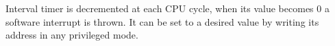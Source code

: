 \label{sec:man:devices}

\label{sec:man:intervalTimer}

Interval timer is decremented at each CPU cycle, when its value becomes 0 a software interrupt is thrown. It can be set to a desired value by writing its address in any privileged mode.


